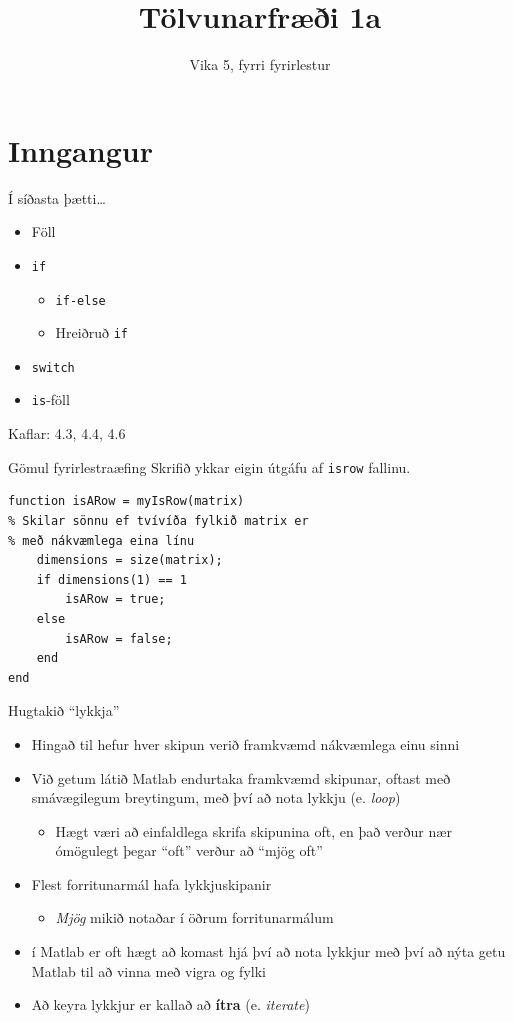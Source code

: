 \documentclass{beamer}
\title{Tölvunarfræði 1a}
\subtitle{Vika 5, fyrri fyrirlestur}
\begin{document}
\begin{frame}
\titlepage
\end{frame}

\section{Inngangur}

\begin{frame}{Í síðasta þætti\ldots}
\begin{itemize}
 \item Föll
 \item \texttt{if}
 \begin{itemize}
  \item \texttt{if-else}
  \item Hreiðruð \texttt{if}
 \end{itemize}
 \item \texttt{switch}
 \item \texttt{is}-föll
\end{itemize}
Kaflar: 4.3, 4.4, 4.6
\end{frame}

\begin{frame}[fragile]{Gömul fyrirlestraæfing}
Skrifið ykkar eigin útgáfu af \texttt{isrow} fallinu. \pause
\begin{verbatim}
function isARow = myIsRow(matrix)
% Skilar sönnu ef tvívíða fylkið matrix er 
% með nákvæmlega eina línu
    dimensions = size(matrix);
    if dimensions(1) == 1
        isARow = true;
    else
        isARow = false;
    end
end
\end{verbatim}

\end{frame}

\begin{frame}{Hugtakið ``lykkja''}
\begin{itemize}
 \item Hingað til hefur hver skipun verið framkvæmd nákvæmlega einu sinni
 \item Við getum látið Matlab endurtaka framkvæmd skipunar, oftast með smávægilegum breytingum, með því að nota lykkju (e. \emph{loop})
 \begin{itemize}
  \item Hægt væri að einfaldlega skrifa skipunina oft, en það verður nær ómögulegt þegar ``oft'' verður að ``mjög oft''
 \end{itemize}
 \item Flest forritunarmál hafa lykkjuskipanir
 \begin{itemize}
  \item \emph{Mjög} mikið notaðar í öðrum forritunarmálum
 \end{itemize}
 \item í Matlab er oft hægt að komast hjá því að nota lykkjur með því að nýta getu Matlab til að vinna með vigra og fylki
 \item Að keyra lykkjur er kallað að \textbf{ítra} (e. \emph{iterate})
\end{itemize}
\end{frame}
\end{document}
